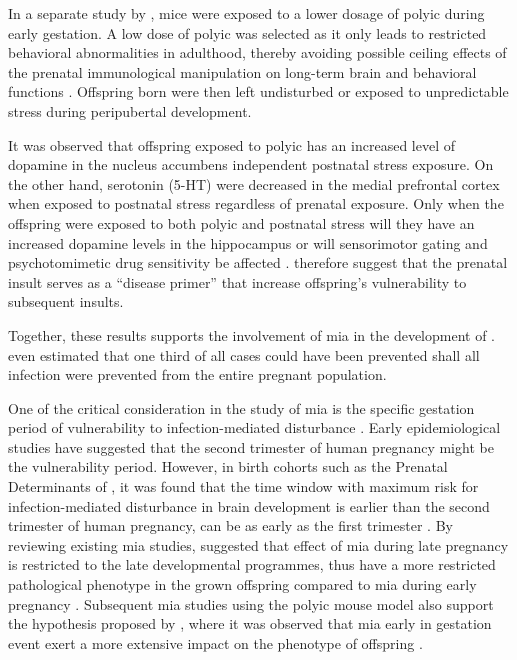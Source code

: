 	In a separate study by \citet{Giovanoli2013}, mice were exposed to a lower dosage of \gls{polyic} during early gestation.
	A low dose of \gls{polyic} was selected as it only leads to restricted behavioral abnormalities in adulthood, thereby avoiding possible ceiling effects of the prenatal immunological manipulation on long-term brain and behavioral functions \citep{Giovanoli2013}. 
	Offspring born were then left undisturbed or exposed to unpredictable stress during peripubertal development.
	
	It was observed that offspring exposed to \gls{polyic} has an increased level of dopamine in the nucleus accumbens independent postnatal stress exposure.
	On the other hand, serotonin (5-HT) were decreased in the medial prefrontal cortex when exposed to postnatal stress regardless of prenatal exposure.
	Only when the offspring were exposed to both \gls{polyic} and postnatal stress will they have an increased dopamine levels in the hippocampus or will sensorimotor gating and psychotomimetic drug sensitivity be affected \citep{Giovanoli2013}.
	\citet{Giovanoli2013} therefore suggest that the prenatal insult serves as a ``disease primer'' that increase offspring's vulnerability to subsequent insults.
	
	Together, these results supports the involvement of \gls{mia} in the development of .
	\citet{Brown2010} even estimated that one third of all  cases could have been prevented shall all infection were prevented from the entire pregnant population.
	
	One of the critical consideration in the study of \gls{mia} is the specific gestation period of vulnerability to infection-mediated disturbance \citep{Meyer2007a}.
	Early epidemiological studies have suggested that the second trimester of human pregnancy might be the vulnerability period.
	However, in birth cohorts such as the Prenatal Determinants of , it was found that the time window with maximum risk for infection-mediated disturbance in brain development is earlier than the second trimester of human pregnancy, can be as early as the first trimester \citep{Meyer2007a}.
	By reviewing existing \gls{mia} studies, \citet{Meyer2007a} suggested that effect of \gls{mia} during late pregnancy is restricted to the late developmental programmes, thus have a more restricted pathological phenotype in the grown offspring compared to \gls{mia} during early pregnancy \citep{Meyer2007a}.
	Subsequent \gls{mia} studies using the \gls{polyic} mouse model also support the hypothesis proposed by \citet{Meyer2007a}, where it was observed that \gls{mia} early in gestation event exert a more extensive impact on the phenotype of offspring \citep{Li2009c,Li2010a}.

